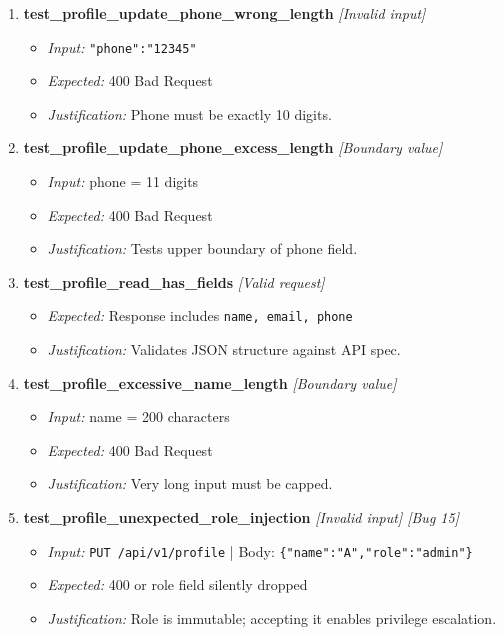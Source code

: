 \documentclass{article}
\begin{document}
\begin{enumerate}[resume, label=\textbf{TC\arabic*.}]
\item \textbf{test\_profile\_update\_phone\_wrong\_length} \textit{[Invalid input]}
\begin{itemize}[noitemsep]
  \item \textit{Input:} \texttt{"phone":"12345"}
  \item \textit{Expected:} 400 Bad Request
  \item \textit{Justification:} Phone must be exactly 10 digits.
\end{itemize}

\item \textbf{test\_profile\_update\_phone\_excess\_length} \textit{[Boundary value]}
\begin{itemize}[noitemsep]
  \item \textit{Input:} phone = 11 digits
  \item \textit{Expected:} 400 Bad Request
  \item \textit{Justification:} Tests upper boundary of phone field.
\end{itemize}

\item \textbf{test\_profile\_read\_has\_fields} \textit{[Valid request]}
\begin{itemize}[noitemsep]
  \item \textit{Expected:} Response includes \texttt{name, email, phone}
  \item \textit{Justification:} Validates JSON structure against API spec.
\end{itemize}

\item \textbf{test\_profile\_excessive\_name\_length} \textit{[Boundary value]}
\begin{itemize}[noitemsep]
  \item \textit{Input:} name = 200 characters
  \item \textit{Expected:} 400 Bad Request
  \item \textit{Justification:} Very long input must be capped.
\end{itemize}

\item \textbf{test\_profile\_unexpected\_role\_injection} \textit{[Invalid input] \textit{[Bug 15]}}
\begin{itemize}[noitemsep]
  \item \textit{Input:} \texttt{PUT /api/v1/profile} | Body: \texttt{\{"name":"A","role":"admin"\}}
  \item \textit{Expected:} 400 or role field silently dropped
  \item \textit{Justification:} Role is immutable; accepting it enables privilege escalation.
\end{itemize}
\end{enumerate}
\end{document}
